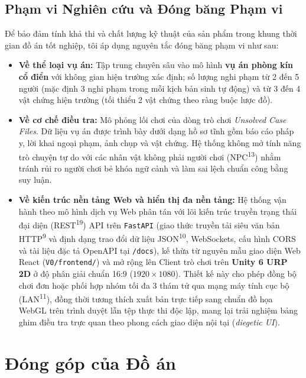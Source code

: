 \subsection{Phạm vi Nghiên cứu và Đóng băng Phạm vi}
Để bảo đảm tính khả thi và chất lượng kỹ thuật của sản phẩm trong khung thời gian đồ án tốt nghiệp, tôi áp dụng nguyên tắc đóng băng phạm vi như sau:
\begin{itemize}[leftmargin=1.5cm]
    \item \textbf{Về thể loại vụ án:} Tập trung chuyên sâu vào mô hình \textbf{vụ án phòng kín cổ điển} với không gian hiện trường xác định; số lượng nghi phạm từ 2 đến 5 người (mặc định 3 nghi phạm trong mỗi kịch bản sinh tự động) và từ 3 đến 4 vật chứng hiện trường (tối thiểu 2 vật chứng theo ràng buộc lược đồ).
    \item \textbf{Về cơ chế điều tra:} Mô phỏng lối chơi của dòng trò chơi \textit{Unsolved Case Files}. Dữ liệu vụ án được trình bày dưới dạng hồ sơ tĩnh gồm báo cáo pháp y, lời khai ngoại phạm, ảnh chụp và vật chứng. Hệ thống không mở tính năng trò chuyện tự do với các nhân vật không phải người chơi (NPC\textsuperscript{13}) nhằm tránh rủi ro người chơi bẻ khóa ngữ cảnh và làm sai lệch chuẩn công bằng suy luận.
    \item \textbf{Về kiến trúc nền tảng Web và hiển thị đa nền tảng:} Hệ thống vận hành theo mô hình dịch vụ Web phân tán với lõi kiến trúc truyền trạng thái đại diện (REST\textsuperscript{19}) API trên \texttt{FastAPI} (giao thức truyền tải siêu văn bản HTTP\textsuperscript{9} và định dạng trao đổi dữ liệu JSON\textsuperscript{10}, WebSockets, cấu hình CORS và tài liệu đặc tả OpenAPI tại \texttt{/docs}), kế thừa từ nguyên mẫu giao diện Web React (\texttt{V0/frontend/}) và mở rộng lên Client trò chơi trên \textbf{Unity 6 URP 2D} ở độ phân giải chuẩn 16:9 ($1920\times 1080$). Thiết kế này cho phép đồng bộ chơi đơn hoặc phối hợp nhóm tối đa 3 thám tử qua mạng máy tính cục bộ (LAN\textsuperscript{11}), đồng thời tương thích xuất bản trực tiếp sang chuẩn đồ họa WebGL trên trình duyệt lẫn tệp thực thi độc lập, mang lại trải nghiệm bảng ghim điều tra trực quan theo phong cách giao diện nội tại (\textit{diegetic UI}).
\end{itemize}

\section{Đóng góp của Đồ án}
\label{sec:intro_contributions}

